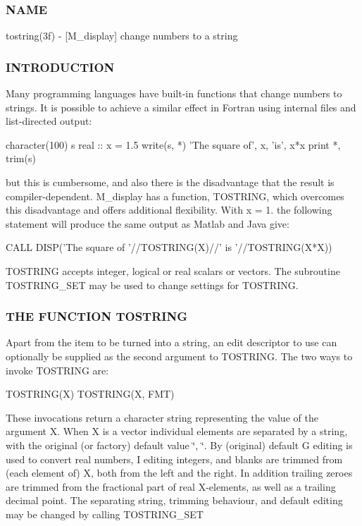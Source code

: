 \subsubsection*{N\+A\+ME}

tostring(3f) -\/ \mbox{[}M\+\_\+display\mbox{]} change numbers to a string 

\subsubsection*{I\+N\+T\+R\+O\+D\+U\+C\+T\+I\+ON}

Many programming languages have built-\/in functions that change numbers to strings. It is possible to achieve a similar effect in Fortran using internal files and list-\/directed output\+: \begin{DoxyVerb}  character(100) s
  real :: x = 1.5
  write(s, *) 'The square of', x, 'is', x*x
  print *, trim(s)
\end{DoxyVerb}


but this is cumbersome, and also there is the disadvantage that the result is compiler-\/dependent. M\+\_\+display has a function, T\+O\+S\+T\+R\+I\+NG, which overcomes this disadvantage and offers additional flexibility. With x = 1. the following statement will produce the same output as Matlab and Java give\+: \begin{DoxyVerb}  CALL DISP('The square of '//TOSTRING(X)//' is '//TOSTRING(X*X))
\end{DoxyVerb}


T\+O\+S\+T\+R\+I\+NG accepts integer, logical or real scalars or vectors. The subroutine T\+O\+S\+T\+R\+I\+N\+G\+\_\+\+S\+ET may be used to change settings for T\+O\+S\+T\+R\+I\+NG.

\subsubsection*{T\+HE F\+U\+N\+C\+T\+I\+ON T\+O\+S\+T\+R\+I\+NG}

Apart from the item to be turned into a string, an edit descriptor to use can optionally be supplied as the second argument to T\+O\+S\+T\+R\+I\+NG. The two ways to invoke T\+O\+S\+T\+R\+I\+NG are\+: \begin{DoxyVerb}  TOSTRING(X)
  TOSTRING(X, FMT)
\end{DoxyVerb}


These invocations return a character string representing the value of the argument X. When X is a vector individual elements are separated by a string, with the original (or factory) default value \char`\"{}, \char`\"{}. By (original) default G editing is used to convert real numbers, I editing integers, and blanks are trimmed from (each element of) X, both from the left and the right. In addition trailing zeroes are trimmed from the fractional part of real X-\/elements, as well as a trailing decimal point. The separating string, trimming behaviour, and default editing may be changed by calling T\+O\+S\+T\+R\+I\+N\+G\+\_\+\+S\+ET

